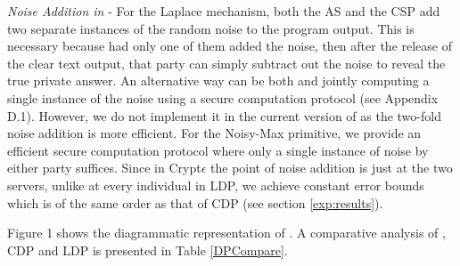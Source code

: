 \textit{Noise Addition in \system} - For the Laplace mechanism, both the \textsf{AS} and the \textsf{CSP} add two separate instances of the random noise to the program output. This is necessary because had only one of them added the noise, then after the release of the clear text output, that party can simply subtract out the noise to reveal the true private answer. An alternative way can be both \AS and \CSP jointly computing a single instance of the noise using a secure computation protocol (see Appendix D.1). However, we do not implement it in the current version of \system as the two-fold noise addition is more efficient. For the Noisy-Max primitive, we provide an efficient secure computation protocol where only a single instance of noise by either party suffices. 
Since in Crypt$\epsilon$ the point of noise addition is just at the two servers, unlike at every individual in \textsf{LDP}, we achieve constant error bounds which is of the same order as that of \textsf{CDP} (see section \ref{exp:results}). 
 

Figure 1 shows the diagrammatic representation of \system. A comparative analysis of \system, \textsf{CDP} and \textsf{LDP} is presented in  Table \ref{DPCompare}.
\begin{table}[h!]
\centering
\caption {Comparative analysis of the different DP models}
\label{DPCompare}
\end{table}





